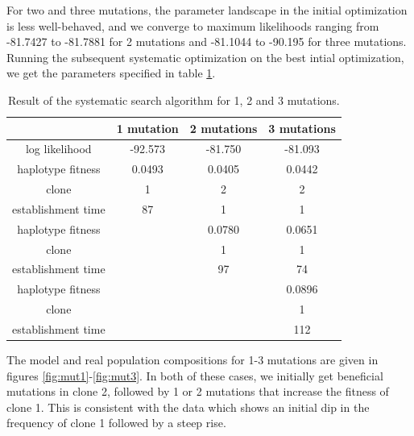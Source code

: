 \documentclass{article}
\begin{document}
For two and three mutations, the parameter landscape in the initial optimization is less well-behaved, and we converge to maximum likelihoods ranging from -81.7427 to -81.7881 for 2 mutations and -81.1044 to -90.195 for three mutations. Running the subsequent systematic optimization on the best intial optimization, we get the parameters specified in table \ref{tab:fitness}.

\begin{table}[h]
\centering
\begin{tabular}{ |c|c|c|c|}
\hline
 & 1 mutation & 2 mutations & 3 mutations \\
\hline
log likelihood & -92.573 & -81.750 & -81.093 \\
\hline
haplotype fitness & 0.0493 & 0.0405 & 0.0442\\
clone & 1 & 2 & 2\\ 
establishment time & 87 & 1 & 1 \\
\hline
haplotype fitness &   & 0.0780 & 0.0651\\
clone &  & 1 & 1\\ 
establishment time &  & 97 & 74 \\
\hline
haplotype fitness &   & & 0.0896\\
clone &  &  & 1\\ 
establishment time &  &  & 112 \\
\hline
\end{tabular}
\caption{Result of the systematic search algorithm for 1, 2 and 3 mutations.}
\label{tab:fitness}
\end{table}

The model and real population compositions for 1-3 mutations are given in figures \ref{fig:mut1}-\ref{fig:mut3}.
In both of these cases, we initially get beneficial mutations in clone 2, followed by 1 or 2 mutations that increase the fitness of clone 1. This is consistent with the data which shows an initial dip in the frequency of clone 1 followed by a steep rise.
\end{document}
